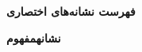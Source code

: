 \centerline{\textbf{فهرست نشانه‌های اختصاری}}

\vspace{\baselineskip}
\noindent
\textbf{نشانه}\hfill\textbf{مفهوم}

\vspace{\baselineskip}
\noindent
{}
